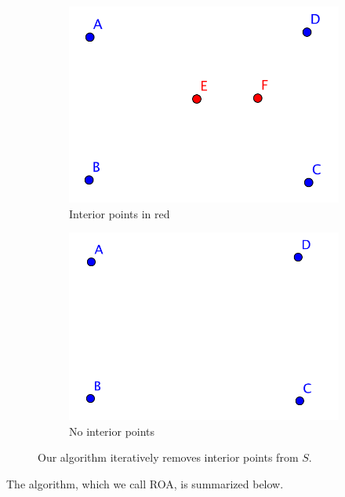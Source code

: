\begin{figure}[!htb]
\centering
\begin{subfigure}[b]{.33\linewidth}
\includegraphics[width=\linewidth]{2_interior_points}
\caption{Interior points in red}\label{fig:2_interior_points}
\end{subfigure}\hspace{20 mm}
\begin{subfigure}[b]{.33\linewidth}
\includegraphics[width=\linewidth]{no_interior_points}
\caption{No interior points}\label{fig:no_interior_points}
\end{subfigure}
\caption{Our algorithm iteratively removes interior points from $S$.}
\label{fig:interior_points}
\end{figure}

The algorithm, which we call ROA, is summarized below.
\\

